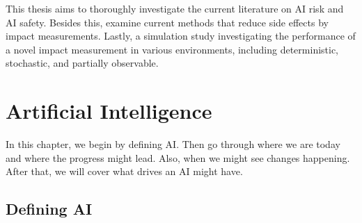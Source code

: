 \documentclass[12pt,A4]{report}
\newcommand{\autobaj}{}
\theoremstyle{definition}
\begin{document}
This thesis aims to thoroughly investigate the current literature on AI risk and AI safety. Besides this, examine current methods that reduce side effects by impact measurements. Lastly, a simulation study investigating the performance of a novel impact measurement in various environments, including deterministic, stochastic, and partially observable. 


\chapter{Artificial Intelligence}
In this chapter, we begin by defining AI. Then go through where we are today and where the progress might lead. Also, when we might see changes happening. After that, we will cover what drives an AI might have.

\section{Defining AI}
\end{document}
